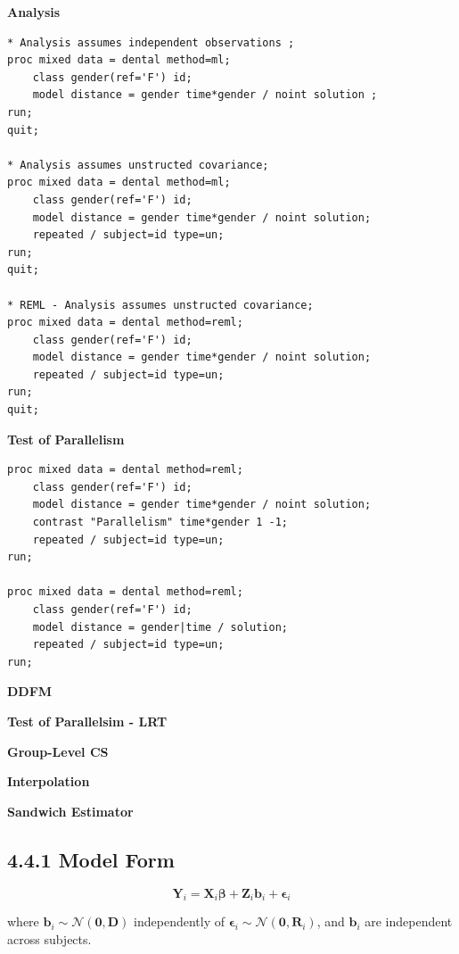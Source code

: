 \documentclass[11pt]{article}
\newcommand{\bY}{\mathbf{Y}}
\newcommand{\bX}{\mathbf{X}}
\newcommand{\bZ}{\mathbf{Z}}
\newcommand{\bbeta}{\boldsymbol{\beta}}
\newcommand{\bepsilon}{\boldsymbol{\epsilon}}
\newcommand{\Normal}{\mathcal{N}}
\begin{document}
\textbf{Analysis}
\begin{lstlisting}[style=SASstyle]
* Analysis assumes independent observations ;
proc mixed data = dental method=ml;
	class gender(ref='F') id;
	model distance = gender time*gender / noint solution ;
run;
quit;

* Analysis assumes unstructed covariance;
proc mixed data = dental method=ml;
	class gender(ref='F') id;
	model distance = gender time*gender / noint solution;
	repeated / subject=id type=un;
run;
quit;

* REML - Analysis assumes unstructed covariance;
proc mixed data = dental method=reml;
	class gender(ref='F') id;
	model distance = gender time*gender / noint solution;
	repeated / subject=id type=un;
run;
quit;
\end{lstlisting}

\textbf{Test of Parallelism}
\begin{lstlisting}[style=SASstyle]
proc mixed data = dental method=reml;
	class gender(ref='F') id;
	model distance = gender time*gender / noint solution;
	contrast "Parallelism" time*gender 1 -1;
	repeated / subject=id type=un;
run;

proc mixed data = dental method=reml;
	class gender(ref='F') id;
	model distance = gender|time / solution;
	repeated / subject=id type=un;
run;
\end{lstlisting}

\textbf{DDFM}

\textbf{Test of Parallelsim - LRT}

\textbf{Group-Level CS}

\textbf{Interpolation}

\textbf{Sandwich Estimator}



\newpage

\begin{tcolorbox}[modelbox, title={Model 4: Linear Mixed Effects Model (LMM)}]
\end{tcolorbox}

\subsection*{4.4.1 Model Form}

$$\bY_i = \bX_i \bbeta + \bZ_i \mathbf{b}_i + \bepsilon_i$$

where $\mathbf{b}_i \sim \Normal(\mathbf{0}, \mathbf{D})$ independently of $\bepsilon_i \sim \Normal(\mathbf{0}, \mathbf{R}_i)$, and $\mathbf{b}_i$ are independent across subjects.
\end{document}
